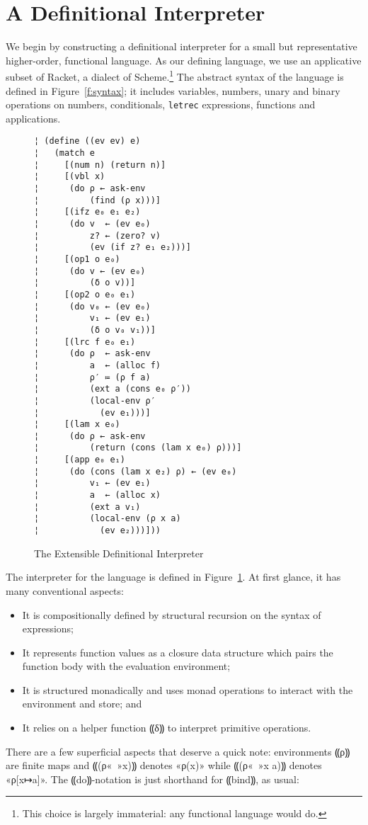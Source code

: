 \section{A Definitional Interpreter}\label{s:interp}

We begin by constructing a definitional interpreter for a small but
representative higher-order, functional language.  As our defining language, we
use an applicative subset of Racket, a dialect of Scheme.\footnote{This choice
is largely immaterial: any functional language would do.} The abstract syntax
of the language is defined in Figure~\ref{f:syntax}; it includes variables,
numbers, unary and binary operations on numbers, conditionals, {\tt letrec}
expressions, functions and applications.

\begin{figure} %
\begin{lstlisting}
¦ (define ((ev ev) e)
¦   (match e
¦     [(num n) (return n)]
¦     [(vbl x)
¦      (do ρ ← ask-env
¦          (find (ρ x)))]    
¦     [(ifz e₀ e₁ e₂) 
¦      (do v  ← (ev e₀)
¦          z? ← (zero? v)
¦          (ev (if z? e₁ e₂)))]
¦     [(op1 o e₀)
¦      (do v ← (ev e₀)
¦          (δ o v))]   
¦     [(op2 o e₀ e₁)
¦      (do v₀ ← (ev e₀)
¦          v₁ ← (ev e₁)
¦          (δ o v₀ v₁))]
¦     [(lrc f e₀ e₁) 
¦      (do ρ  ← ask-env
¦          a  ← (alloc f)
¦          ρ′ ≔ (ρ f a)
¦          (ext a (cons e₀ ρ′))
¦          (local-env ρ′
¦            (ev e₁)))]
¦     [(lam x e₀)
¦      (do ρ ← ask-env
¦          (return (cons (lam x e₀) ρ)))]
¦     [(app e₀ e₁)
¦      (do (cons (lam x e₂) ρ) ← (ev e₀)
¦          v₁ ← (ev e₁)
¦          a  ← (alloc x)         
¦          (ext a v₁)
¦          (local-env (ρ x a) 
¦            (ev e₂)))]))
\end{lstlisting}
\caption{The Extensible Definitional Interpreter}
\label{f:interpreter}
\end{figure} %

The interpreter for the language is defined in Figure~\ref{f:interpreter}. At
first glance, it has many conventional aspects:
\begin{itemize}
\item It is compositionally defined by structural recursion on the syntax of
expressions;
\item It represents function values as a closure data structure which pairs the
function body with the evaluation environment;
\item It is structured monadically and uses monad operations to interact with
the environment and store; and
\item It relies on a helper function ⸨δ⸩ to interpret primitive operations.
\end{itemize}
There are a few superficial aspects that deserve a quick note:
environments ⸨ρ⸩ are finite maps and ⸨(ρ«\ »x)⸩ denotes
«ρ(x)» while ⸨(ρ«\ »x a)⸩ denotes «ρ[x↦a]».  The
⸨do⸩-notation is just shorthand for ⸨bind⸩, as usual:

